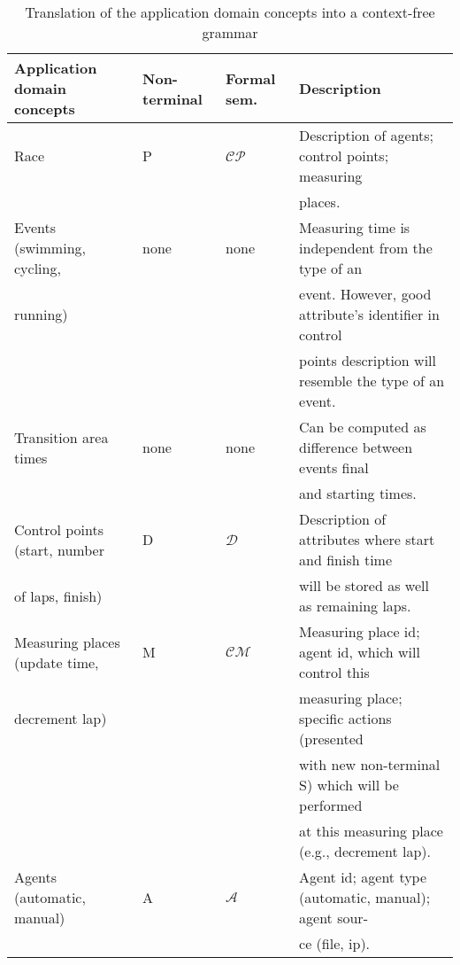 \documentclass[preprint, prX]{revtex4}
\begin{document}
\begin{table*}[htb]
\caption{Translation of the application domain concepts into a context-free grammar}
\label{tab:tab1}
\vspace{-5mm}
\scriptsize
\begin{center}
\begin{tabular}{ l  l  l  l }
\hline
Application domain concepts &  Non-terminal & Formal sem. & Description \\

\hline
Race & P & $\mathcal{CP}$ & Description of agents; control points; measuring \\
 & & & places. \\
\hline
Events (swimming, cycling, & none & none & Measuring time is independent from the type of an \\
running) & & & event. However, good attribute's identifier in control \\
 & & & points description will resemble the type of an event. \\
\hline
Transition area times & none & none & Can be computed as difference between events final \\
 & & & and starting times. \\
\hline
Control points (start, number & D & $\mathcal{D}$ & Description of attributes where start and finish time \\
of laps, finish) & & & will be stored as well as remaining laps. \\
\hline
Measuring places (update time, & M & $\mathcal{CM}$ & Measuring place id; agent id, which will control this \\
decrement lap) & & & measuring place; specific actions (presented \\
 & & & with new non-terminal S) which will be performed \\
 & & & at this measuring place (e.g., decrement lap). \\
\hline
Agents (automatic, manual) & A & $\mathcal{A}$ & Agent id; agent type (automatic, manual); agent sour- \\
 & & & ce (file, ip). \\
\hline
\end{tabular}
\end{center}
\normalsize
\vspace{-5mm}
\end{table*}
\end{document}
